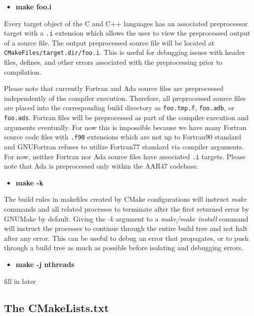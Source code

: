 \documentclass[12pt,letterpaper]{article}
\begin{document}
\begin{itemize}
\item \textbf{make foo.i}
\end{itemize}

Every target object of the C and C++ languages has an associated preprocessor target with a \verb|.i| extension which allows the user to view the preprocessed output of a source file.  The output preprocessed source file will be located at \verb|CMakeFiles/target.dir/foo.i|.  This is useful for debugging issues with header files, defines, and other errors associated with the preprocessing prior to compilation.

Please note that currently Fortran and Ada source files are preprocessed independently of the compiler execution.  Therefore, all preprocessed source files are placed into the corresponding build directory as \verb|foo.tmp.f|, \verb|foo.adb|, or \verb|foo.ads|. Fortran files will be preprocessed as part of the compiler execution and arguments eventually.  For now this is impossible because we have many Fortran source code files with \verb|.f90| extensions which are not up to Fortran90 standard and GNUFortran refuses to utilize Fortran77 standard via compiler arguments.  For now, neither Fortran nor Ada source files have associated \verb|.i| targets.  Please note that Ada is preprocessed only within the AAR47 codebase.

\begin{itemize}
\item \textbf{make -k}
\end{itemize}

The build rules in makefiles created by CMake configurations will instruct \emph{make} commands and all related processes to terminate after the first returned error by GNUMake by default.  Giving the \emph{-k} argument to a \emph{make/make install} command will instruct the processes to continue through the entire build tree and not halt after any error.  This can be useful to debug an error that propagates, or to push through a build tree as much as possible before isolating and debugging errors.

\begin{itemize}
\item \textbf{make -j nthreads}
\end{itemize}

fill in later

\subsection{The CMakeLists.txt}
\end{document}
